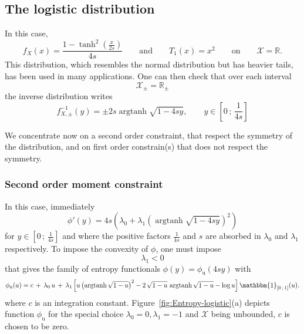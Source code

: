 \documentclass[english,sort&compress]{elsarticle}
\theoremstyle{definition}
\theoremstyle{plain}
\theoremstyle{plain}
\def\Rset{\mathbb{R}}
\def\X{\mathcal{X}}
\def\un{\mathbbm{1}}
\def\argtanh{\operatorname{argtanh}}
\begin{document}


\subsection{The logistic distribution}
\label{subsec:Logistic}

In this case, 
%
\[
f_X(x)  = \frac{1  -  \tanh^2\!\left(\frac{x}{2s}\right)}{4s} \qquad  \mbox{and}
\qquad T_1(x) = x^2 \qquad \mbox{on} \qquad \X = \Rset.
\]
This  distribution, which  resembles  the normal  distribution  but has  heavier
tails, has  been used in  many applications. One  can then check that  over each
interval
%
\[
\X_\pm = \Rset_\pm
\]
%
the inverse distribution writes 
%
\[
f_{X,\pm}^{-1}(y) = \pm 2 s \argtanh \sqrt{1-4sy}, \qquad y \in \left[ 0 \, ; \,
  \frac{1}{4s} \right]
\]

We concentrate  now on a second  order constraint, that respect  the symmetry of
the  distribution, and on  first order  constrain(s) that  does not  respect the
symmetry.



\subsubsection{Second order moment constraint}

In this case, immediately 
%
\[
\phi'(y)  =  4  s  \left(  \lambda_0  +  \lambda_1  \left(  \argtanh\sqrt{1-4sy}
  \right)^2 \right)
\]
%
for $y \in \left[ 0 \, ; \, \frac{1}{4s} \right]$ and where the positive factors
$\frac{1}{4   s}$  and  $s$   are  absorbed   in  $\lambda_0$   and  $\lambda_1$
respectively.  To impose the convexity of $\phi$, one must impose
%
\[
\lambda_1 < 0
\]
%
that gives  the family of  entropy functionals $\phi(y) =  \phi_{\mathrm{u}}(4 s
y)$ with
%
\[
\phi_{\mathrm{u}}(u) = c \,  + \,  \lambda_0 \, u  \, +  \, \lambda_1  \left[ u
  \left( \argtanh\sqrt{1-u} \right)^2 -  2 \, \sqrt{1-u} \, \argtanh\sqrt{1-u} -
  \log u \right] \un_{\left[ 0 \, ; \, 1 \right]}(u).
\]
%
where  $c$  is  an integration  constant.   Figure~\ref{fig:Entropy-logistic}(a)
depicts  function $\phi_{\mathrm{u}}$  for the  special choice  $\lambda_0 =  0,
\lambda_1 = -1$ and $\X$ being unbounded, $c$ is chosen to be zero.


\end{document}
